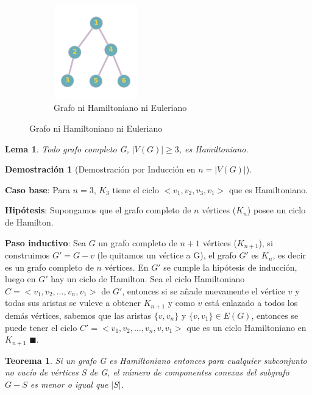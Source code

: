 \documentclass[a4paper,1pt]{report}
\newtheorem*{teo}{Teorema}
\newtheorem*{dem}{Demostración}
\newtheorem*{lem}{Lema}
\begin{document}
\begin{figure}[H]
\begin{subfigure}[b]{0.45\textwidth}
    \centering
    \includegraphics[width=0.4\textwidth]{figures4/arbol.png}
    \caption{Grafo ni Hamiltoniano ni Euleriano}
    \end{subfigure}
\end{figure} 


\begin{lem}
    Todo grafo completo G, $|V(G)|\geq 3$, es Hamiltoniano. 
\end{lem}
   
   
   \begin{dem}[Demostración por Inducción en $n = |V(G)|$]\end{dem}
   
   \textbf{Caso base}: Para $n=3$, $K_3$  tiene el ciclo  $<v_1,v_2,v_3,v_1>$ que es Hamiltoniano.
   
   \textbf{Hipótesis}: Supongamos que el grafo completo de $n$ v\'ertices ($K_n$) posee un ciclo de Hamilton.
   
   \textbf{Paso inductivo}: Sea $G$ un grafo completo de $n+1$ v\'ertices ($K_{n+1}$), si construimos $G' = G - v$ (le quitamos un v\'ertice a G), el grafo $G'$ es $K_n$, es decir es un grafo completo de $n$ v\'ertices.
   En $G'$ se cumple la hip\'otesis de inducci\'on, luego en $G'$ hay un ciclo de Hamilton.   
   Sea el ciclo Hamiltoniano $C = <v_1,v_2,\dots,v_n,v_1>$ de $G'$, entonces si se añade nuevamente el vértice $v$ y todas sus aristas se vuleve a obtener $K_{n+1}$ y como $v$ est\'a enlazado a todos los dem\'as v\'ertices, sabemos que las aristas $\{v, v_n\}$ y $\{v, v_1\} \in E(G)$, entonces se puede tener el ciclo $C' = <v_1,v_2,\dots,v_n,v,v_1>$ que es un ciclo Hamiltoniano en $K_{n+1}$ $\blacksquare$. 
   
   \begin{teo}
    Si un grafo G es Hamiltoniano entonces para cualquier subconjunto no vacío de vértices S de G, el número de componentes conexas del subgrafo $G - S$ es menor o igual que  $|S|$.
   \end{teo}
\end{document}

